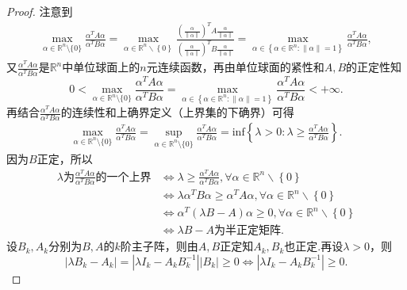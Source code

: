 \documentclass[../../main.tex]{subfiles}%
\begin{document}
\begin{proof}
注意到
\begin{align*}
\max_{\alpha \in \mathbb{R} ^n\setminus \{0\}} \frac{\alpha ^TA\alpha}{\alpha ^TB\alpha}=\underset{\alpha \in \mathbb{R} ^n\backslash \left\{ 0 \right\}}{\max}\frac{\left( \frac{\alpha}{\left\| \alpha \right\|} \right) ^TA\frac{\alpha}{\left\| \alpha \right\|}}{\left( \frac{\alpha}{\left\| \alpha \right\|} \right) ^TB\frac{\alpha}{\left\| \alpha \right\|}}=\underset{\alpha \in \left\{ \alpha \in \mathbb{R} ^n:\left\| \alpha \right\| =1 \right\}}{\max}\frac{\alpha ^TA\alpha}{\alpha ^TB\alpha},
\end{align*}
又$\frac{\alpha ^TA\alpha}{\alpha ^TB\alpha}$是$\mathbb{R} ^n$中单位球面上的$n$元连续函数，再由单位球面的紧性和$A,B$的正定性知
$$0<\max_{\alpha \in \mathbb{R} ^n\setminus \{0\}} \frac{\alpha ^TA\alpha}{\alpha ^TB\alpha}=\underset{\alpha \in \left\{ \alpha \in \mathbb{R} ^n:\left\| \alpha \right\| =1 \right\}}{\max}\frac{\alpha ^TA\alpha}{\alpha ^TB\alpha}<+\infty .$$
再结合$\frac{\alpha ^TA\alpha}{\alpha ^TB\alpha}$的连续性和上确界定义（上界集的下确界）可得
\begin{align}
\max_{\alpha \in \mathbb{R} ^n\setminus \{0\}} \frac{\alpha ^TA\alpha}{\alpha ^TB\alpha}=\mathop {\mathrm{sup}} \limits_{\alpha \in \mathbb{R} ^n\setminus \{0\}}\frac{\alpha ^TA\alpha}{\alpha ^TB\alpha}=\mathrm{inf}\left\{ \lambda >0:\lambda \geqslant \frac{\alpha ^TA\alpha}{\alpha ^TB\alpha} \right\}.\label{eq:423rewfj80rj893uf34t5321.1}
\end{align}
因为$B$正定，所以
\begin{align*}
\lambda \text{为}\frac{\alpha ^TA\alpha}{\alpha ^TB\alpha}\text{的一个上界}&\Longleftrightarrow \lambda \geqslant \frac{\alpha ^TA\alpha}{\alpha ^TB\alpha},\forall \alpha \in \mathbb{R} ^n\backslash \left\{ 0 \right\} \\
&\Longleftrightarrow \lambda \alpha ^TB\alpha \geqslant \alpha ^TA\alpha ,\forall \alpha \in \mathbb{R} ^n\backslash \left\{ 0 \right\} \\
&\Longleftrightarrow \alpha ^T\left( \lambda B-A \right) \alpha \geqslant 0,\forall \alpha \in \mathbb{R} ^n\backslash \left\{ 0 \right\} \\
&\Longleftrightarrow \lambda B-A\text{为半正定矩阵}.
\end{align*}
设$B_k,A_k$分别为$B,A$的$k$阶主子阵，则由$A,B$正定知$A_k,B_k$也正定.再设$\lambda >0$，则
$$\left| \lambda B_k-A_k \right|=\left| \lambda I_k-A_kB_{k}^{-1} \right|\left| B_k \right|\geqslant 0\Longleftrightarrow \left| \lambda I_k-A_kB_{k}^{-1} \right|\geqslant 0.$$

\end{proof}
\end{document}

